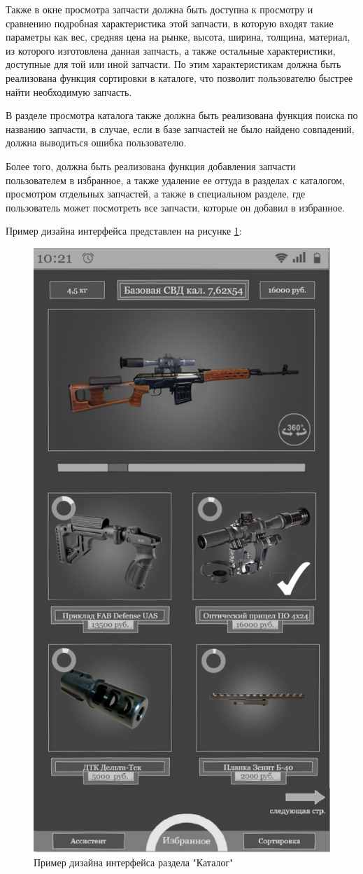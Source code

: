 \documentclass[14pt]{extreport}
\begin{document}
Также в окне просмотра запчасти должна быть доступна к просмотру и сравнению подробная характеристика этой запчасти, в которую входят такие параметры как вес, средняя цена на рынке, высота, ширина, толщина, материал, из которого изготовлена данная запчасть, а также остальные характеристики, доступные для той или иной запчасти. По этим характеристикам должна быть реализована функция сортировки в каталоге, что позволит пользователю быстрее найти необходимую запчасть.

В разделе просмотра каталога также должна быть реализована функция поиска по названию запчасти, в случае, если в базе запчастей не было найдено совпадений, должна выводиться ошибка пользователю. 

Более того, должна быть реализована функция добавления запчасти пользователем в избранное, а также удаление ее оттуда в разделах с каталогом, просмотром отдельных запчастей, а также в специальном разделе, где пользователь может посмотреть все запчасти, которые он добавил в избранное.

Пример дизайна интерфейса представлен на рисунке \ref{int}:
\begin{figure}[H]
\centerline{\includegraphics[width=0.52\linewidth]{pic}}
\caption{Пример дизайна интерфейса раздела "Каталог"}
\label{int}
\end{figure}
\end{document}
